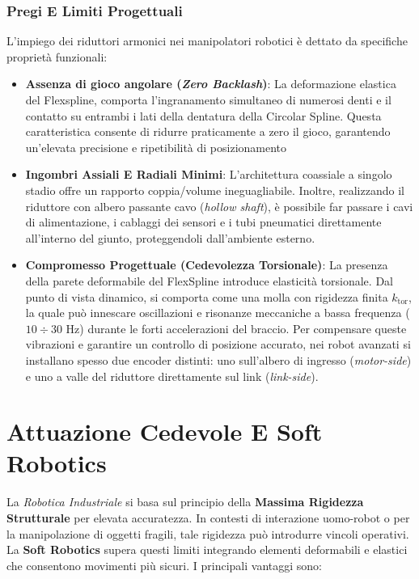 ﻿\documentclass[11pt, a4paper]{article}
\begin{document}
\subsubsection{Pregi E Limiti Progettuali}
L'impiego dei riduttori armonici nei manipolatori robotici è dettato da specifiche proprietà funzionali:
\begin{itemize}
    \item \textbf{Assenza di gioco angolare (\textit{Zero Backlash})}: La deformazione elastica del Flexspline, comporta l'ingranamento simultaneo di numerosi denti e il contatto su entrambi i lati della dentatura della Circolar Spline. Questa caratteristica consente di ridurre praticamente a zero il gioco, garantendo un'elevata precisione e ripetibilità di posizionamento
    \item \textbf{Ingombri Assiali E Radiali Minimi}: L'architettura coassiale a singolo stadio offre un rapporto coppia/volume ineguagliabile. Inoltre, realizzando il riduttore con albero passante cavo (\textit{hollow shaft}), è possibile far passare i cavi di alimentazione, i cablaggi dei sensori e i tubi pneumatici direttamente all'interno del giunto, proteggendoli dall'ambiente esterno.
    \item \textbf{Compromesso Progettuale (Cedevolezza Torsionale)}: La presenza della parete deformabile del FlexSpline introduce elasticità torsionale. Dal punto di vista dinamico, si comporta come una molla con rigidezza finita $k_{\text{tor}}$, la quale può innescare oscillazioni e risonanze meccaniche a bassa frequenza ($10 \div 30\text{ Hz}$) durante le forti accelerazioni del braccio. Per compensare queste vibrazioni e garantire un controllo di posizione accurato, nei robot avanzati si installano spesso due encoder distinti: uno sull'albero di ingresso (\textit{motor-side}) e uno a valle del riduttore direttamente sul link (\textit{link-side}).
\end{itemize}
\newpage


\section{Attuazione Cedevole E Soft Robotics}

La \textit{Robotica Industriale}  si basa sul principio della \textbf{Massima Rigidezza Strutturale} per  elevata accuratezza. In contesti di interazione uomo-robot o per la manipolazione di oggetti fragili, tale rigidezza può introdurre vincoli operativi. La \textbf{Soft Robotics} supera questi limiti integrando elementi deformabili e elastici che consentono movimenti più sicuri. I principali vantaggi sono:
\end{document}
